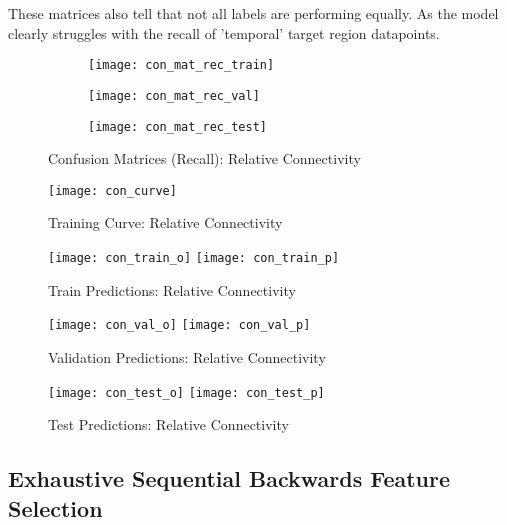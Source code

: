 These matrices also tell that not all labels are performing equally. As the model clearly struggles with the recall of 'temporal' target region datapoints.

\begin{figure}[H]
\centering
\begin{subfigure}{0.49\textwidth}
  \centering
  \texttt{[image: con\_mat\_rec\_train]}
\end{subfigure}
\hfill
\begin{subfigure}{0.49\textwidth}
  \centering
  \texttt{[image: con\_mat\_rec\_val]}
\end{subfigure}
\begin{subfigure}{0.49\textwidth}
  \centering
  \texttt{[image: con\_mat\_rec\_test]}
\end{subfigure}
\caption{Confusion Matrices (Recall): Relative Connectivity}
\label{fig:conf_rec}
\end{figure}

\begin{figure}[H]
\centering
\texttt{[image: con\_curve]}
\caption{Training Curve: Relative Connectivity}
\label{fig:curve-con}
\end{figure}

\begin{figure}[H]
\centering
\texttt{[image: con\_train\_o]}
\texttt{[image: con\_train\_p]}
\caption{Train Predictions: Relative Connectivity}
\label{fig:pred-tra-con}
\end{figure}

\begin{figure}[H]
\centering
\texttt{[image: con\_val\_o]}
\texttt{[image: con\_val\_p]}
\caption{Validation Predictions: Relative Connectivity}
\label{fig:pred-val-con}
\end{figure}

\begin{figure}[H]
\centering
\texttt{[image: con\_test\_o]}
\texttt{[image: con\_test\_p]}
\caption{Test Predictions: Relative Connectivity}
\label{fig:pred-tes-con}
\end{figure}

\subsection{Exhaustive Sequential Backwards Feature Selection}
\label{sec:seqback}

